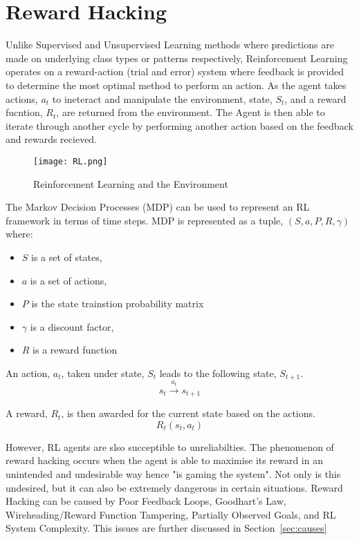 \chapter{Reward Hacking}
\label{chap:chap5}
Unlike Supervised and Unsupervised Learning methods where predictions are made on underlying class types or patterns respectively, 
Reinforcement Learning operates on a reward-action (trial and error) system where feedback is provided to determine the most optimal method to perform an action.
As the agent takes actions, $a_t$ to ineteract and manipulate the environment, state, $S_t$, and a reward fucntion, $R_t$, are returned from the environment. 
The Agent is then able to iterate through another cycle by performing another action based on the feedback and rewards recieved.

\begin{figure}[H]
    \centering
    \caption{Reinforcement Learning and the Environment \cite{amiri_mehrpouyan_fridman_mallik_nallanathan_matolak_2018}}
    \texttt{[image: RL.png]}
    \label{fig:RL}
\end{figure}

The Markov Decision Processes (MDP) can be used to represent an RL framework in terms of time steps.
MDP is represented as a tuple, $(S, a, P, R, \gamma)$ where:
\begin{itemize}
    \item $S$ is a set of states,
    \item $a$ is a set of actions,
    \item $P$ is the state trainstion probability matrix
    \item $\gamma$ is a discount factor, 
    \item $R$ is a reward function 
\end{itemize}   

An action, $a_t$, taken under state, $S_t$ leads to the following state, $S_{t+1}$. 
\begin{equation}
    s_t \xrightarrow{a_t} s_{t+1}
\end{equation}

A reward, $R_t$, is then awarded for the current state based on the actions.
\begin{equation}
    R_t(s_t, a_t) 
\end{equation}

However, RL agents are slso succeptible to unreliabilties. The phenomenon of reward hacking occurs when the agent is able to maximise its reward in an unintended and undesirable way hence "is gaming the system".
Not only is this undesired, but it can also be extremely dangerous in certain situations. 
Reward Hacking can be caused by Poor Feedback Loops, Goodhart's Law, Wireheading/Reward Function Tampering, Partially Observed Goals, and RL System Complexity. 
This issues are further discussed in Section~\ref{sec:causes}

